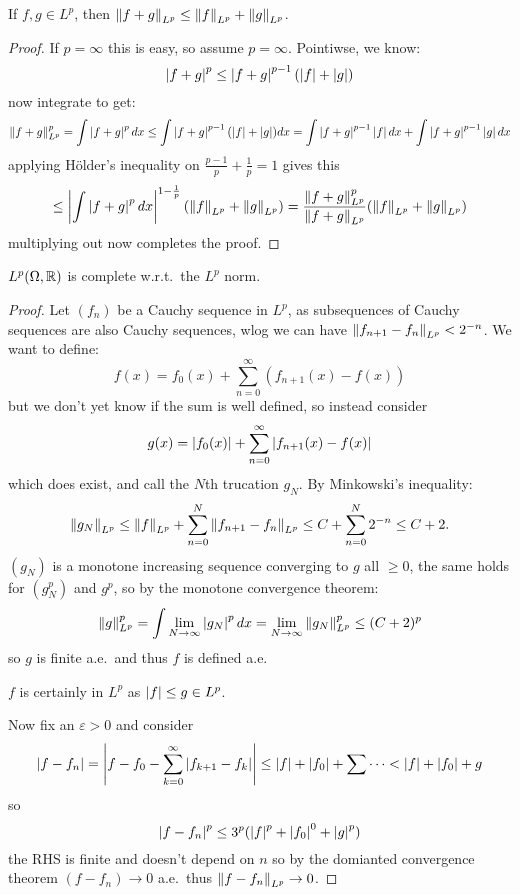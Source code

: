 \documentclass{article}
\begin{document}
\begin{proposition}
    If $f,g\in L^p$, then $\left\lVert f + g \right\rVert_{L^p} \leq \left\lVert f \right\rVert_{L^p} + \left\lVert g \right\rVert_{L^p}$.\begin{proof}
        If $p=\infty$ this is easy, so assume $p=\infty$. Pointiwse, we know: \[
        \left| f + g \right|^p \leq \left| f + g \right|^{p-1}(\left| f \right| + \left| g \right|)
        \] now integrate to get: \[
        \left\lVert f+g \right\rVert_{L^p}^p=\int\left| f + g \right|^pdx \leq \int\left| f + g \right|^{p-1}(\left| f \right| + \left| g \right|)dx = \int\left| f + g \right|^{p-1}\left| f \right|dx+\int\left| f + g \right|^{p-1}\left| g \right|dx
        \] applying H\"older's inequality on $\frac{p-1}{p} + \frac{1}{p} = 1$ gives this\[
        \leq \left| \int\left| f+g \right|^pdx \right|^{1-\frac{1}{p}}(\left\lVert f \right\rVert_{L^p}+\left\lVert g \right\rVert_{L^p}) = \frac{\left\lVert f+g \right\rVert_{L^p}^p}{\left\lVert f+g \right\rVert_{L^p}}(\left\lVert f \right\rVert_{L^p}+\left\lVert g \right\rVert_{L^p})\] multiplying out now completes the proof.
    \end{proof}
\end{proposition}

\begin{theorem}
    $L^p(\Omega,\mathbb{R})$ is complete w.r.t.~the $L^p$ norm.
    \begin{proof}
        Let $(f_n)$ be a Cauchy sequence in $L^p$, as subsequences of Cauchy sequences are also Cauchy sequences, wlog we can have $\left\lVert f_{n+1}-f_n \right\rVert_{L^p}< 2^{-n}$. We want to define: \[
            f(x) = f_0(x) + \sum_{n=0}^\infty(f_{n+1}(x)-f(x))
        \] but we don't yet know if the sum is well defined, so instead consider \[
            g(x) = \left| f_0(x) \right| + \sum_{n=0}^\infty\left| f_{n+1}(x)-f(x) \right|
        \] which does exist, and call the $N$th trucation $g_N$. By Minkowski's inequality: \[
            \left\lVert g_N \right\rVert_{L^p} \leq \left\lVert f \right\rVert_{L^p} + \sum_{n=0}^N\left\lVert f_{n+1}-f_n \right\rVert_{L^p} \leq C + \sum_{n=0}^N2^{-n} \leq C + 2.
        \] $(g_N)$ is a monotone increasing sequence converging to $g$ all $\geq 0$, the same holds for $(g_N^p)$ and $g^p$, so by the monotone convergence theorem: \[
            \left\lVert g \right\rVert_{L^p}^p = \int\lim_{N\rightarrow\infty}\left| g_N \right|^pdx = \lim_{N\rightarrow\infty}\left\lVert g_N \right\rVert_{L^p}^p\leq(C+2)^p
        \] so $g$ is finite a.e.~and thus $f$ is defined a.e.

        $f$ is certainly in $L^p$ as $\left| f \right|\leq g\in L^p$.

        Now fix an $\varepsilon>0$ and consider \[
        \left| f-f_n \right| = \left| f-f_0 - \sum_{k=0}^\infty\left| f_{k+1}-f_k \right| \right|\leq \left| f \right|+\left| f_0 \right| + \sum\cdots < \left| f \right| + \left| f_0 \right| + g
        \]so \[
        \left| f-f_n \right|^p \leq 3^p(\left| f \right|^p+\left| f_0 \right|^0 + \left| g \right|^p)
        \] the RHS is finite and doesn't depend on $n$ so by the domianted convergence theorem $(f-f_n)\rightarrow 0$ a.e.~thus $\left\lVert f-f_n \right\rVert_{L^p}\rightarrow 0$.
    \end{proof}
\end{theorem}
\end{document}
